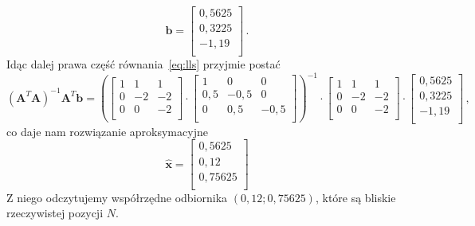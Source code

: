 \begin{equation*}
    \mathbf{b} =
    \left[
        \begin{matrix}
            0,5625\\
            0,3225\\
            -1,19\\
        \end{matrix}
    \right]\,.
\end{equation*}
Idąc dalej prawa część równania~\ref{eq:lls} przyjmie postać
\begin{equation*}
    {\left(\mathbf{A}^T\mathbf{A}\right)}^{-1}\mathbf{A}^T\mathbf{b} =
    {\left(
    \left[
        \begin{matrix}
            1 & 1 & 1\\
            0 & -2 & -2\\
            0 & 0 & -2\\
        \end{matrix}
    \right]
    \cdot
    \left[
        \begin{matrix}
            1 & 0 & 0\\
            0,5 & -0,5 & 0\\
            0 & 0,5 & -0,5\\
        \end{matrix}
    \right]
    \right)}^{-1}
    \cdot
    \left[
        \begin{matrix}
            1 & 1 & 1\\
            0 & -2 & -2\\
            0 & 0 & -2\\
        \end{matrix}
    \right]
    \cdot
    \left[
        \begin{matrix}
            0,5625\\
            0,3225\\
            -1,19\\
        \end{matrix}
    \right]\,,
\end{equation*}
co daje nam rozwiązanie aproksymacyjne
\begin{equation*}
    \hat{\mathbf{x}} =
    \left[
    \begin{matrix}
        0,5625\\
        0,12\\
        0,75625\\
    \end{matrix}
    \right]
\end{equation*}
Z niego odczytujemy współrzędne odbiornika $(0,12;0,75625)$, które są bliskie rzeczywistej pozycji $N$.

